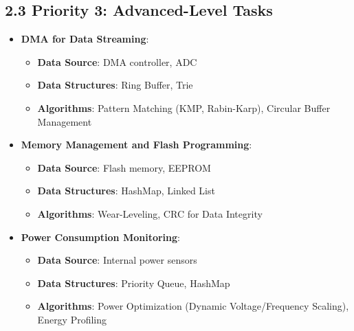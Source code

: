\documentclass{article}
\begin{document}
\subsection*{2.3 Priority 3: Advanced-Level Tasks}
\begin{itemize}
    \item \textbf{DMA for Data Streaming}:
    \begin{itemize}
        \item \textbf{Data Source}: DMA controller, ADC
        \item \textbf{Data Structures}: Ring Buffer, Trie
        \item \textbf{Algorithms}: Pattern Matching (KMP, Rabin-Karp), Circular Buffer Management
    \end{itemize}
    
    \item \textbf{Memory Management and Flash Programming}:
    \begin{itemize}
        \item \textbf{Data Source}: Flash memory, EEPROM
        \item \textbf{Data Structures}: HashMap, Linked List
        \item \textbf{Algorithms}: Wear-Leveling, CRC for Data Integrity
    \end{itemize}
    
    \item \textbf{Power Consumption Monitoring}:
    \begin{itemize}
        \item \textbf{Data Source}: Internal power sensors
        \item \textbf{Data Structures}: Priority Queue, HashMap
        \item \textbf{Algorithms}: Power Optimization (Dynamic Voltage/Frequency Scaling), Energy Profiling
    \end{itemize}
\end{itemize}
\end{document}
